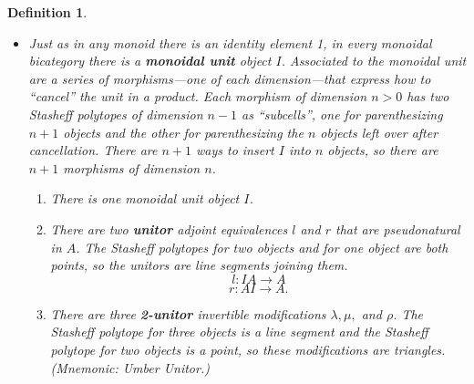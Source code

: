 \documentclass{article}
\newtheorem{defn}{Definition}
\newcommand{\maps}{\colon}
\begin{document}
\begin{defn}
\begin{itemize}
\item Just as in any monoid there is an identity element 1, in every monoidal bicategory there is a {\bf monoidal unit} object $I$. Associated to the monoidal unit are a series of morphisms---one of each dimension---that express how to ``cancel'' the unit in a product. Each morphism of dimension $n>0$ has two Stasheff polytopes of dimension $n-1$ as ``subcells'', one for parenthesizing $n+1$ objects and the other for parenthesizing the $n$ objects left over after cancellation.  There are $n+1$ ways to insert $I$ into $n$ objects, so there are $n+1$ morphisms of dimension $n$.
  \begin{enumerate}
    \item There is one monoidal unit object $I$.
    \item There are two {\bf unitor} adjoint equivalences $l$ and $r$ that are pseudonatural in $A$.  The Stasheff polytopes for two objects and for one object are both points, so the unitors are line segments joining them.
        \[ l\maps I A \rightarrow A \]
        \[ r\maps A I \rightarrow A. \]
    \item There are three {\bf 2-unitor} invertible modifications $\lambda, \mu,$ and $\rho$. The Stasheff polytope for three objects is a line segment and the Stasheff polytope for two objects is a point, so these modifications are triangles.  (Mnemonic: Umber Unitor.)
      \begin{center}
      \end{center}
      \begin{center}
\end{center}
\end{enumerate}
\end{itemize}
\end{defn}
\end{document}
